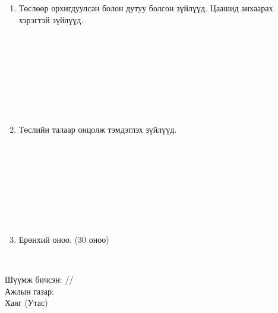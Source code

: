 \newpage

\begin{titlepage}
\begin{enumerate}
\item [4.] Төслөөр орхигдуулсан болон дутуу болсон зүйлүүд. Цаашид анхаарах хэрэгтэй зүйлүүд.
\begin{center}
\dotfill \\[0.1cm]
\dotfill \\[0.1cm]
\dotfill \\[0.1cm]
\dotfill \\[0.1cm]
\dotfill \\[0.1cm]
\dotfill \\[0.1cm]
\dotfill \\[0.4cm]
\end{center}
\item [5.] Төслийн талаар онцолж тэмдэглэх зүйлүүд.
\begin{center}
\dotfill \\[0.1cm]
\dotfill \\[0.1cm]
\dotfill \\[0.1cm]
\dotfill \\[0.1cm]
\dotfill \\[0.1cm]
\dotfill \\[0.1cm]
\dotfill \\[0.4cm]
\end{center}
\item [6.] Ерөнхий оноо. (30 оноо)
\begin{center}
\dotfill \\[1cm]
\end{center}
\end{enumerate}
Шүүмж бичсэн: \makebox[3cm]{\dotfill} /\readname/ \\[0.5cm]
Ажлын газар: \dotfill \\[0.5cm]
Хаяг (Утас) \makebox[5cm]{\dotfill}
\end{titlepage}

